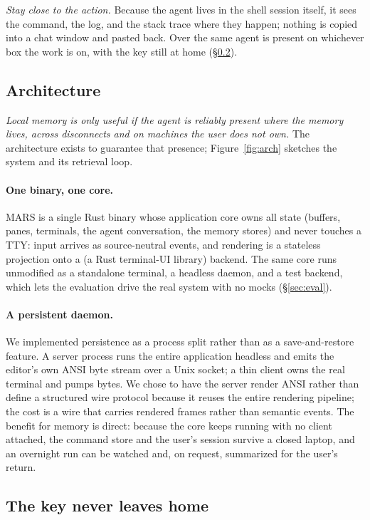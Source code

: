 \emph{Stay close to the action.} Because the agent lives in the shell session itself,
it sees the command, the log, and the stack trace where they happen; nothing is copied
into a chat window and pasted back. Over  the same agent is present on
whichever box the work is on, with the key still at home (\S\ref{sec:broker}).

\subsection{Architecture}
\label{sec:system}

\emph{Local memory is only useful if the agent is reliably present where the memory
lives, across disconnects and on machines the user does not own.} The architecture
exists to guarantee that presence; Figure~\ref{fig:arch} sketches the system and its
retrieval loop.

\paragraph{One binary, one core.}
MARS is a single Rust binary whose application core owns all state (buffers, panes,
terminals, the agent conversation, the memory stores) and never touches a TTY:
input arrives as source-neutral events, and rendering is a stateless projection onto a
 (a Rust terminal-UI library) backend. The same core runs unmodified as a standalone terminal, a
headless daemon, and a test backend, which lets the evaluation drive the real system
with no mocks (\S\ref{sec:eval}).

\paragraph{A persistent daemon.}
We implemented persistence as a process split rather than as a save-and-restore feature.
A server process runs the entire application headless and emits the editor's own ANSI
byte stream over a Unix socket; a thin client owns the real terminal and pumps bytes. We
chose to have the server render ANSI rather than define a structured wire protocol
because it reuses the entire rendering pipeline; the cost is a wire that carries
rendered frames rather than semantic events.
The benefit for memory is direct: because the core keeps running with no client attached,
the command store and the user's session survive a closed laptop, and an overnight run
can be watched and, on request, summarized for the user's return.

\subsection{The key never leaves home}
\label{sec:broker}

